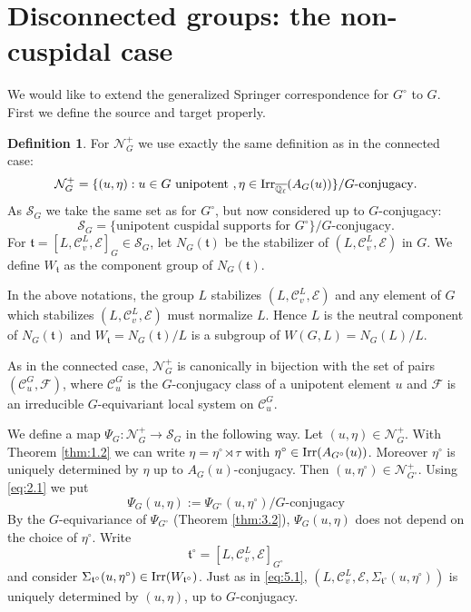 \documentclass[11pt]{amsart}
\theoremstyle{definition}
\newtheorem{defn}[thm]{Definition}
\newcommand{\Q}{\mathbb Q}
\def\Irr{{\rm Irr}}
\def\cC{{\mathcal C}}
\def\cS{{\mathcal S}}
\def\cN{{\mathcal N}}
\def\cE{{\mathcal E}}
\def\cF{{\mathcal F}}
\def\ft{{\mathfrak t}}
\begin{document}
\section{Disconnected groups: the non-cuspidal case}
\label{sec:noncusp}

We would like to extend the generalized Springer correspondence
for $G^\circ$ to $G$. First we define the source and target properly.

\begin{defn}\label{defn:5.1}
For $\cN_G^+$ we use exactly the same definition as in the connected case:
\[
\cN_G^+ = \{ (u,\eta) : u \in G \text{ unipotent }, 
\eta \in \Irr_{\overline{\Q_{\ell}}} (A_G (u)) \} / G\text{-conjugacy} .
\]
As $\cS_G$ we take the same set as for $G^\circ$, but now considered up to
$G$-conjugacy:
\[
\cS_G = \{ \text{unipotent cuspidal supports for } G^\circ \}
/ G\text{-conjugacy} .
\]
For $\ft = [L,\cC_v^L,\cE]_G \in \cS_G$, let $N_G (\ft)$ be the stabilizer of 
$(L,\cC_v^L,\cE)$ in $G$. We define $W_\ft$ as the component group of $N_G (\ft)$.
\end{defn}

In the above notations, the group $L$ stabilizes $(L,\cC_v^L,\cE)$ and any 
element of $G$ which stabilizes $(L,\cC_v^L,\cE)$ must normalize $L$. Hence 
$L$ is the neutral component of $N_G (\ft)$ and $W_\ft = N_G (\ft) / L$ is a 
subgroup of $W(G,L) = N_G (L) / L$. 

As in the connected case, $\cN_G^+$ is canonically in bijection with the
set of pairs $(\cC^G_u,\cF)$, where $\cC^G_u$ is the $G$-conjugacy class of
a unipotent element $u$ and $\cF$ is an irreducible $G$-equivariant 
local system on $\cC^G_u$.

We define a map $\Psi_G : \cN_G^+ \to \cS_G$ in the following way. Let
$(u,\eta) \in \cN_G^+$. With Theorem \ref{thm:1.2} we can write
$\eta = \eta^\circ \rtimes \tau$ with $\eta^\circ \in \Irr (A_{G^\circ}(u))$.
Moreover $\eta^\circ$ is uniquely determined by $\eta$ up to $A_G (u)$-conjugacy.
Then $(u,\eta^\circ) \in \cN_{G^\circ}^+$. Using \eqref{eq:2.1} we put
\begin{equation}\label{eq:5.1}
\Psi_G (u,\eta) := \Psi_{G^\circ} (u,\eta^\circ) / G\text{-conjugacy}
\end{equation}
By the $G$-equivariance of $\Psi_{G^\circ}$ (Theorem \ref{thm:3.2}), 
$\Psi_G (u,\eta)$ does not depend on the choice of $\eta^\circ$. Write 
\[
\ft^\circ = [L,\cC_v^L,\cE]_{G^\circ}
\]
and consider $\Sigma_{\ft^\circ} (u,\eta^\circ) \in \Irr (W_{\ft^\circ})$. 
Just as in \eqref{eq:5.1}, $(L,\cC_v^L,\cE,\Sigma_{\ft^\circ} (u,\eta^\circ))$ 
is uniquely determined by $(u,\eta)$, up to $G$-conjugacy.
\end{document}

